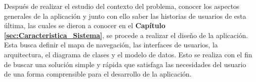 Después de realizar el estudio del contexto del problema, conocer los aspectos generales de la aplicación y junto con ello saber las historias de usuarios de esta última, las cuales se dieron a conocer en el \textbf{Capítulo \ref{sec:Caracteristica_Sistema}}, se procede a realizar el diseño de la aplicación. Esta busca definir el mapa de navegación, las interfaces de usuarios, la arquitectura, el diagrama de clases y el modelo de datos. Esto se realiza con el fin de buscar una solución simple y rápida que satisfaga las necesidades del usuario de una forma comprensible para el desarrollo de la aplicación.